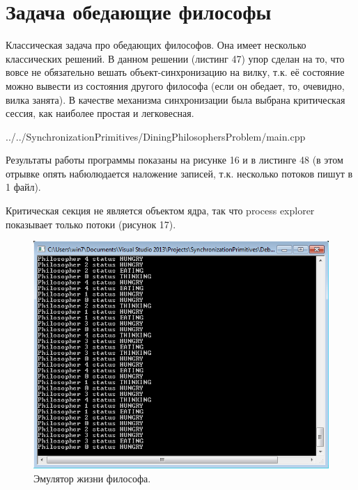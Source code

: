 \documentclass[a4paper, 12pt]{article}		%
\begin{document}
\newpage
\section{Задача обедающие философы}

Классическая задача про обедающих философов. Она имеет несколько классических решений. В данном решении (листинг 47) упор сделан на то, что вовсе не обязательно вешать объект-синхронизацию на вилку, т.к. её состояние можно вывести из состояния другого философа (если он обедает, то, очевидно, вилка занята). В качестве механизма синхронизации была выбрана критическая сессия, как наиболее простая и легковесная.


{../../SynchronizationPrimitives/DiningPhilosophersProblem/main.cpp}

Результаты работы программы показаны на рисунке 16 и в листинге 48 (в этом отрывке опять набюлюдается наложение записей, т.к. несколько потоков пишут в 1 файл).

Критическая секция не является объектом ядра, так что process explorer показывает только потоки (рисунок 17).

\newpage

\begin{figure}[h!]
\centering
\includegraphics[scale=1]{res/010}
\caption{Эмулятор жизни философа.}
\end{figure}


\end{document}
